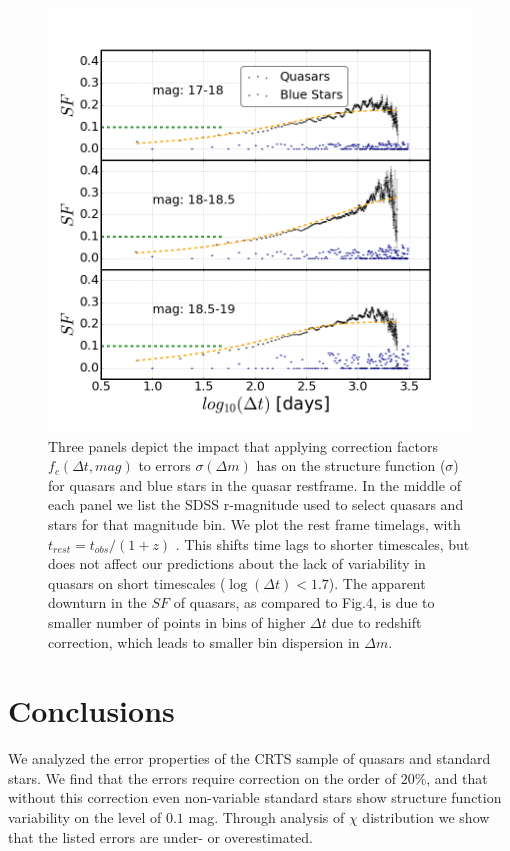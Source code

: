 \documentclass[fleqn,usenatbib]{mnras}  %
\begin{document}
\begin{figure}
\label{fig:5}
 \includegraphics[width=\columnwidth]{Fig_5_SF_QSO_starsB_r_cut_rest.png}
 \caption{Three panels depict the impact that applying correction factors $f_{c}(\Delta t, mag)$ to errors $\sigma(\Delta m)$ has on the structure function ($\sigma$) for quasars and blue stars in the quasar restframe. In the middle of each panel we list the SDSS r-magnitude used to select quasars and stars for that magnitude bin. We plot the rest frame timelags, with $t_{rest} = t_{obs} / (1+z)$ \citep{macleod2010} . This shifts time lags to shorter timescales, but does not affect our predictions about the lack of variability in quasars on short timescales ($\log(\Delta t) < 1.7$). The apparent downturn in the $SF$ of quasars, as compared to Fig.4, is due to smaller number of points in bins of higher $\Delta t$ due to redshift correction, which leads to smaller bin dispersion in $\Delta m$. }
\end{figure}


\section{Conclusions}
We analyzed the error properties of the CRTS sample of quasars and standard stars.  We find that the errors require correction on the order of $20\%$, and that without this correction even non-variable standard stars show structure function variability on the level of $0.1$ mag. Through analysis of $\chi$ distribution we show that the listed errors are under- or overestimated.  
\end{document}
